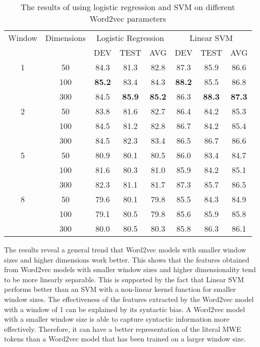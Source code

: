 \documentclass[11pt]{article}
\begin{document}
\begin{table*}[t]
\centering
\begin{tabular}{|c|c|ccc|ccc|} \hline
\multicolumn{1}{|c|}{Window} &
\multicolumn{1}{|c|}{Dimensions} &
\multicolumn{3}{|c|}{Logistic Regression} &
\multicolumn{3}{|c|}{Linear SVM} \\
 & & 		DEV & TEST & AVG & DEV & TEST & AVG \\ \hline
1 & 50  & 84.3 & 81.3 & 82.8 & 87.3 & 85.9 & 86.6 \\
 & 100 & \textbf{85.2} & 83.4 & 84.3 & \textbf{88.2} & 85.5 & 86.8 \\ 
 & 300 & 84.5 & \textbf{85.9} & \textbf{85.2} & 86.3 & \textbf{88.3} & \textbf{87.3} \\ \hline
2 & 50  & 83.8 & 81.6 & 82.7 & 86.4 & 84.2 & 85.3 \\
 & 100 & 84.5 & 81.2 & 82.8 & 86.7 & 84.2 & 85.4  \\ 
 & 300 & 84.5 & 82.3 & 83.4 & 86.5 & 86.7 & 86.6 \\ \hline
5 & 50  & 80.9 & 80.1 & 80.5 & 86.0 & 83.4 & 84.7 \\
 & 100 & 81.6 & 80.3 & 81.0 & 85.9 & 84.2 & 85.1 \\ 
 & 300 & 82.3 & 81.1 & 81.7 & 87.3 & 85.7 & 86.5 \\ \hline
8 & 50  & 79.6 & 80.1 & 79.8 & 85.5 & 84.3 & 84.9 \\
 & 100 & 79.1 & 80.5 & 79.8 & 85.6 & 85.9 & 85.8 \\ 
 & 300 & 80.0 & 80.5 & 80.3 & 85.8 & 86.3 & 86.1  \\ \hline
\end{tabular}
\caption{The results of using logistic regression and SVM on different Word2vec parameters}
\end{table*}

The results reveal a general trend that Word2vec models with smaller window sizes and higher dimensions work better. This shows that the features obtained from Word2vec models with smaller window sizes and higher dimensionality tend to be more linearly separable. This is supported by the fact that Linear SVM performs better than an SVM with a non-linear kernel function for smaller window sizes. The effectiveness of the features extracted by the Word2vec model with a window of 1 can be explained by its syntactic bias. A Word2vec model with a smaller window size is able to capture syntactic information more effectively. Therefore, it can have a better representation of the literal MWE tokens than a Word2vec model that has been trained on a larger window size.    
\end{document}
